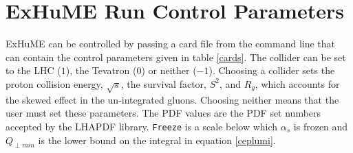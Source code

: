 \chapter{ExHuME Run Control Parameters} \label{appendixa}

ExHuME can be controlled by passing a card file from the command line that can contain the control parameters given in table \ref{cards}. The collider can be set to the LHC ($1$), the Tevatron ($0$) or neither ($-1$). Choosing a collider sets the proton collision energy, $\sqrt{s}$, the survival factor, $S^2$,  and $R_{g}$, which accounts for the skewed effect in the un-integrated gluons. Choosing neither means that the user must set these parameters. The PDF values are the PDF set numbers accepted by the LHAPDF library.  \texttt{Freeze} is a scale below which $\alpha_{s}$ is frozen and $Q_{\perp min}$ is the lower bound on the integral in equation \ref{ceplumi}.

